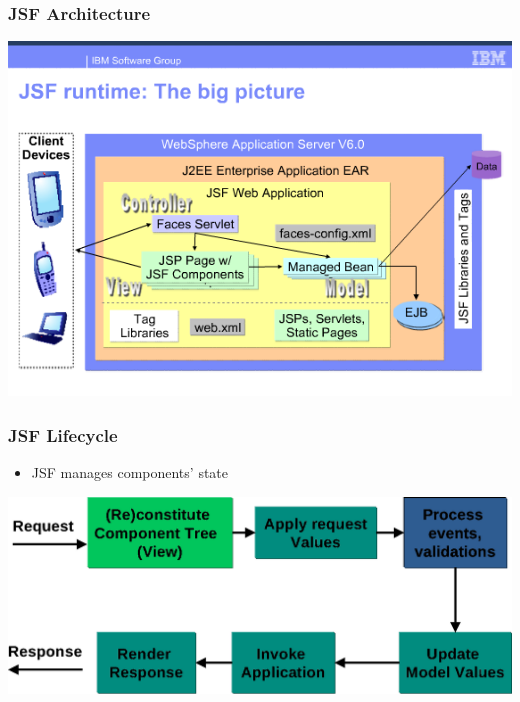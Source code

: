\documentclass[10pt,xcolor=pdflatex]{beamer}
\begin{document}
\begin{frame}\frametitle{JSF Architecture}
\begin{center}
  \includegraphics[scale=0.55]{img/obr5}
\end{center}
\end{frame}


\begin{frame}\frametitle{JSF Lifecycle}
\begin{itemize}
  \item JSF manages components' state
\end{itemize}
\begin{center}
  \includegraphics[scale=0.23]{img/obr6}
\end{center}
\end{frame}
\end{document}
